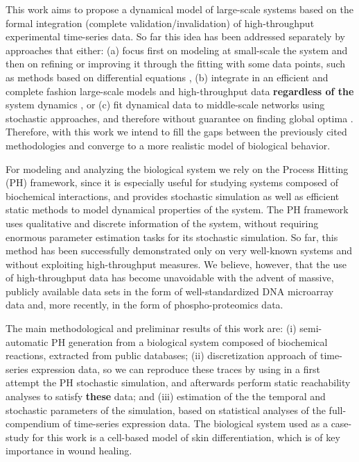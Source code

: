 \documentclass[11pt,a4paper,twoside]{epig}
\begin{document}
This work aims to propose a dynamical model of large-scale systems based on the formal integration 
(complete validation/invalidation) of high-throughput experimental time-series data.  So far this 
idea has been addressed separately by approaches that either: (a) focus first on
modeling at small-scale the system and then on refining or improving it through the fitting with
some data points, such as methods based on differential equations \cite{tyson2003sniffers,batt2005validation,mobashir2012simulated}, (b) integrate in an efficient and complete fashion large-scale models
and high-throughput data \textbf{regardless of the} system dynamics 
\cite{guziolowski2013exhaustively,mitsos2009identifying}, or 
(c) fit dynamical data to middle-scale networks using stochastic approaches, and
therefore without guarantee on finding global optima \cite{macnamara2012state}. Therefore, with this
work we intend to fill the gaps between the previously cited methodologies and converge to a more
realistic model of biological behavior.

For modeling and analyzing the biological system we rely on the Process Hitting (PH) framework\cite{PMR10-TCSB}, 
since it is especially useful for studying systems composed of biochemical interactions, and provides
stochastic simulation as well as efficient static methods to model dynamical properties of the system.
The PH framework uses qualitative and discrete information of the system, without requiring enormous parameter estimation tasks
 for its stochastic simulation. 
So far, this method has been successfully demonstrated only on very well-known systems and without exploiting 
high-throughput measures. We believe, however, that the use of high-throughput data has become unavoidable with 
the advent of massive, publicly available data sets in the form of well-standardized DNA microarray data and, 
more recently, in the form of phospho-proteomics data.  

The main methodological and preliminar results of this work are: (i) semi-automatic PH generation 
from a biological system composed of biochemical reactions, extracted from public databases;
(ii) discretization approach of time-series expression data, so we can 
reproduce these traces by using in a first attempt the PH stochastic simulation, and afterwards 
perform static reachability analyses to satisfy \textbf{these} data; and (iii) estimation of the the temporal and stochastic
parameters of the simulation, based on statistical analyses of the full-compendium of time-series expression data.
The biological system used as a case-study for this work is a cell-based model of skin differentiation, which 
is of key importance in  wound healing. 
\end{document}
